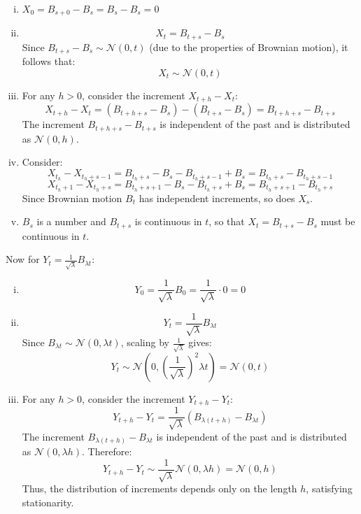 \documentclass[11pt]{extarticle}
\theoremstyle{plain}
\theoremstyle{definition}
\begin{document}
\begin{enumerate}[(a)]
\begin{enumerate}[(i)]
    \item \( X_0 = B_{s+0} - B_s = B_s - B_s = 0 \)
    \item 
    \[
    X_t = B_{t+s} - B_s
    \]
    Since \( B_{t+s} - B_s \sim \mathcal{N}(0, t) \) (due to the properties of Brownian motion), it follows that:
    \[
    X_t \sim \mathcal{N}(0, t)
    \]
    
    \item  
    For any \( h > 0 \), consider the increment \( X_{t+h} - X_t \):
    \[
    X_{t+h} - X_t = \left( B_{t+h+s} - B_s \right) - \left( B_{t+s} - B_s \right) = B_{t+h+s} - B_{t+s}
    \]
    The increment \( B_{t+h+s} - B_{t+s} \) is independent of the past and is distributed as \( \mathcal{N}(0, h) \).
    
    \item Consider:
    \[
    X_{t_h} - X_{t_h+s-1} = B_{t_h+s} - B_{s} - B_{t_h+s-1} + B_{s} = B_{t_h+s} - B_{t_h+s-1}
    \]
     \[
    X_{t_h+1} - X_{t_h+s} = B_{t_h+s+1} - B_{s} - B_{t_h+s} + B_{s} = B_{t_h+s+1} - B_{t_h+s}
    \]
    Since Brownian motion $B_t$ has independent increments, so does $X_s$.
    
    \item $B_s$ is a number and $B_{t+s}$ is continuous in $t$, so that \( X_t = B_{t+s} - B_s \) must be continuous in $t$.
\end{enumerate}

Now for \( Y_t = \frac{1}{\sqrt{\lambda}} B_{\lambda t} \):
\begin{enumerate}[(i)]
    \item
    \[
    Y_0 = \frac{1}{\sqrt{\lambda}} B_{0} = \frac{1}{\sqrt{\lambda}} \cdot 0 = 0
    \]
    \item 
    \[
    Y_t = \frac{1}{\sqrt{\lambda}} B_{\lambda t}
    \]
    Since \( B_{\lambda t} \sim \mathcal{N}(0, \lambda t) \), scaling by \( \frac{1}{\sqrt{\lambda}} \) gives:
    \[
    Y_t \sim \mathcal{N}\left(0, \left(\frac{1}{\sqrt{\lambda}}\right)^2 \lambda t \right) = \mathcal{N}(0, t)
    \]
    
    \item For any \( h > 0 \), consider the increment \( Y_{t+h} - Y_t \):
    \[
    Y_{t+h} - Y_t = \frac{1}{\sqrt{\lambda}} \left( B_{\lambda(t+h)} - B_{\lambda t} \right)
    \]
    The increment \( B_{\lambda(t+h)} - B_{\lambda t} \) is independent of the past and is distributed as \( \mathcal{N}(0, \lambda h) \). Therefore:
    \[
    Y_{t+h} - Y_t \sim \frac{1}{\sqrt{\lambda}} \mathcal{N}(0, \lambda h) = \mathcal{N}(0, h)
    \]
    Thus, the distribution of increments depends only on the length \( h \), satisfying stationarity.
    

\end{enumerate}
\end{enumerate}
\end{document}
